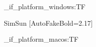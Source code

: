 \sys_if_platform_windows:TF
{
     {SimSun}   [AutoFakeBold=2.17]

}
{
    \ctex_if_platform_macos:TF 
    {

    }
    {

    }
    
}